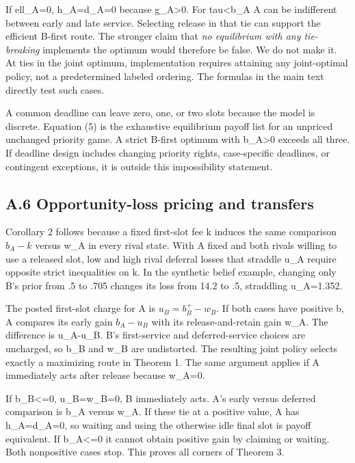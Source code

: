 \documentclass[
  11pt,
]{article}
\begin{document}
If ell\_A=0, h\_A=d\_A=0 because g\_A\textgreater0. For
tau\textless b\_A A can be indifferent between early and late service.
Selecting release in that tie can support the efficient B-first route.
The stronger claim that \emph{no equilibrium with any tie-breaking}
implements the optimum would therefore be false. We do not make it. At
ties in the joint optimum, implementation requires attaining any
joint-optimal policy, not a predetermined labeled ordering. The formulas
in the main text directly test such cases.

A common deadline can leave zero, one, or two slots because the model is
discrete. Equation (5) is the exhaustive equilibrium payoff list for an
unpriced unchanged priority game. A strict B-first optimum with
b\_A\textgreater0 exceeds all three. If deadline design includes
changing priority rights, case-specific deadlines, or contingent
exceptions, it is outside this impossibility statement.

\subsection{A.6 Opportunity-loss pricing and
transfers}\label{a.6-opportunity-loss-pricing-and-transfers}

Corollary 2 follows because a fixed first-slot fee k induces the same
comparison \(b_A-k\) versus w\_A in every rival state. With A fixed and
both rivals willing to use a released slot, low and high rival deferral
losses that straddle u\_A require opposite strict inequalities on k. In
the synthetic belief example, changing only B's prior from .5 to .705
changes its loss from 14.2 to .5, straddling u\_A=1.352.

The posted first-slot charge for A is \(u_B=b_B^+-w_B\). If both cases
have positive b, A compares its early gain \(b_A-u_B\) with its
release-and-retain gain w\_A. The difference is u\_A-u\_B. B's
first-service and deferred-service choices are uncharged, so b\_B and
w\_B are undistorted. The resulting joint policy selects exactly a
maximizing route in Theorem 1. The same argument applies if A
immediately acts after release because w\_A=0.

If b\_B\textless=0, u\_B=w\_B=0, B immediately acts. A's early versus
deferred comparison is b\_A versus w\_A. If these tie at a positive
value, A has h\_A=d\_A=0, so waiting and using the otherwise idle final
slot is payoff equivalent. If b\_A\textless=0 it cannot obtain positive
gain by claiming or waiting. Both nonpositive cases stop. This proves
all corners of Theorem 3.
\end{document}
